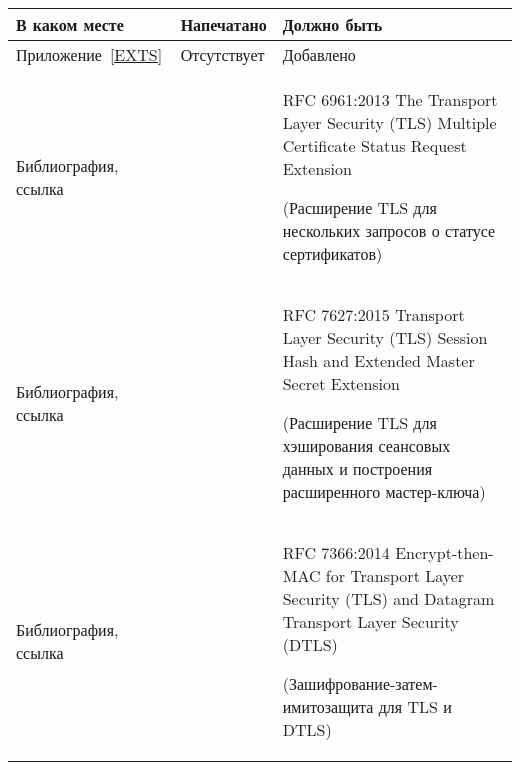 \begin{center}
\begin{tabular}{|p{3.5cm}|p{6cm}|p{6cm}|}
\hline
В каком месте & Напечатано & Должно быть\\
\hline
%
\hline
Приложение~\ref{EXTS} &
Отсутствует &
Добавлено
\\
%
\hline
Библиография, ссылка~\cite{RFC6961} &
&
RFC 6961:2013
The Transport Layer Security (TLS) Multiple Certificate Status 
Request Extension\par
{\small (Расширение TLS для нескольких запросов о статусе сертификатов)}
\\
%
\hline
Библиография, ссылка~\cite{RFC7627} &
&
RFC 7627:2015
Transport Layer Security (TLS) Session Hash and Extended Master Secret 
Extension\par
{\small (Расширение TLS для хэширования сеансовых данных и построения 
расширенного мастер-ключа)}
\\
%
\hline
Библиография, ссылка~\cite{RFC7366} &
&
RFC 7366:2014
Encrypt-then-MAC for Transport Layer Security (TLS) and Datagram Transport 
Layer Security (DTLS)\par
{\small (Зашифрование-затем-имитозащита для TLS и DTLS)}
\\
\hline
\end{tabular}
\end{center}